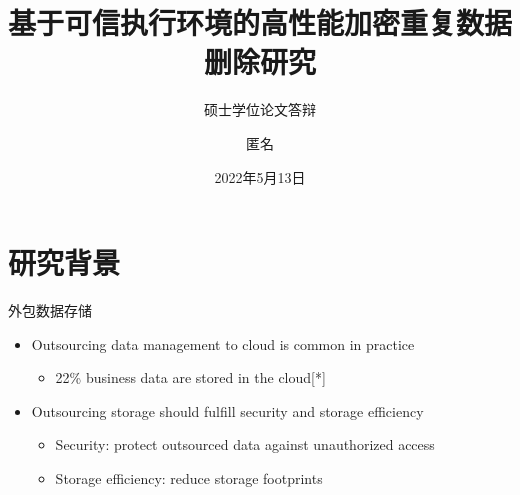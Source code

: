 \documentclass{beamer}
\author{匿名}
\title{基于可信执行环境的高性能加密重复数据删除研究}
\subtitle{硕士学位论文答辩}
\institute{电子科技大学计算机科学与工程学院（网络空间安全学院）}
\date{2022年5月13日}
\begin{document}
\kaishu
\begin{frame}
    \titlepage
\end{frame}



\section{研究背景}


\begin{frame}{外包数据存储}
    \begin{itemize}
        \item Outsourcing data management to cloud is common in practice
              \begin{itemize}
                  \item 22\% business data are stored in the cloud[*]
              \end{itemize}
        \item  Outsourcing storage should fulfill security and storage efficiency
              \begin{itemize}
                  \item  Security: protect outsourced data against unauthorized access
                  \item  Storage efficiency: reduce storage footprints
              \end{itemize}
    \end{itemize}
\end{frame}
\end{document}
